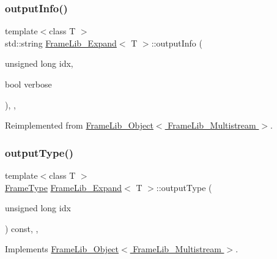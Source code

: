 \subsubsection{\texorpdfstring{output\+Info()}{outputInfo()}}
{\footnotesize\ttfamily template$<$class T $>$ \\
std\+::string \hyperlink{class_frame_lib___expand}{Frame\+Lib\+\_\+\+Expand}$<$ T $>$\+::output\+Info (\begin{DoxyParamCaption}\item[{unsigned long}]{idx,  }\item[{bool}]{verbose }\end{DoxyParamCaption})\hspace{0.3cm}{\ttfamily [inline]}, {\ttfamily [override]}, {\ttfamily [virtual]}}



Reimplemented from \hyperlink{class_frame_lib___object_a6e6d79e8d620eedbaa50abf324cdedf5}{Frame\+Lib\+\_\+\+Object$<$ Frame\+Lib\+\_\+\+Multistream $>$}.

\mbox{\label{class_frame_lib___expand_a235019747538c76a1505f60e0773c041}} 
\subsubsection{\texorpdfstring{output\+Type()}{outputType()}}
{\footnotesize\ttfamily template$<$class T $>$ \\
\hyperlink{_frame_lib___types_8h_ad495a9f61af7fff07d7e97979d1ab854}{Frame\+Type} \hyperlink{class_frame_lib___expand}{Frame\+Lib\+\_\+\+Expand}$<$ T $>$\+::output\+Type (\begin{DoxyParamCaption}\item[{unsigned long}]{idx }\end{DoxyParamCaption}) const\hspace{0.3cm}{\ttfamily [inline]}, {\ttfamily [override]}, {\ttfamily [virtual]}}



Implements \hyperlink{class_frame_lib___object_a03eb408844f15d8f73cee67f43149b9d}{Frame\+Lib\+\_\+\+Object$<$ Frame\+Lib\+\_\+\+Multistream $>$}.

\mbox{\label{class_frame_lib___expand_aab1637f19abfa1ca21abb9f2bbff6062}} 
